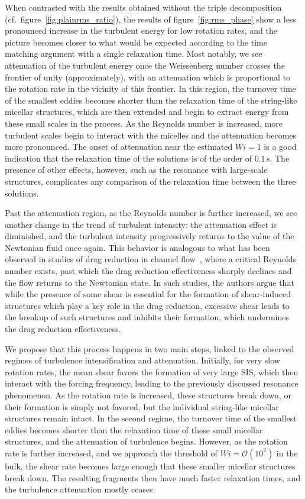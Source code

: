 \documentclass[aps,prfluids,groupedaddress,showkeys,11pt,tightenlines]{revtex4-2}
\begin{document}
When contrasted with the results obtained without the triple decomposition (cf.\ figure~\ref{fig:plainrms_ratio}), the results of figure~\ref{fig:rms_phase} show a less pronounced increase in the turbulent energy for low rotation rates, and the picture becomes closer to what would be expected according to the time matching argument with a single relaxation time. Most notably, we see attenuation of the turbulent energy once the Weissenberg number crosses the frontier of unity (approximately), with an attenuation which is proportional to the rotation rate in the vicinity of this frontier. In this region, the turnover time of the smallest eddies becomes shorter than the relaxation time of the string-like micellar structures, which are then extended and begin to extract energy from these small scales in the process. As the Reynolds number is increased, more turbulent scales begin to interact with the micelles and the attenuation becomes more pronounced. The onset of attenuation near the estimated $Wi=1$ is a good indication that the relaxation time of the solutions is of the order of $0.1$\,s. The presence of other effects, however, such as the resonance with large-scale structures, complicates any comparison of the relaxation time between the three solutions.

Past the attenuation region, as the Reynolds number is further increased, we see another change in the trend of turbulent intensity: the attenuation effect is diminished, and the turbulent intensity progressively returns to the value of the Newtonian fluid once again. This behavior is analogous to what has been observed in studies of drag reduction in channel flow~\cite{motozawa_experimental_2011,wei_combined_2012}, where a critical Reynolds number exists, past which the drag reduction effectiveness sharply declines and the flow returns to the Newtonian state. In such studies, the authors argue that while the presence of some shear is essential for the formation of shear-induced structures which play a key role in the drag reduction, excessive shear leads to the breakup of such structures and inhibits their formation, which undermines the drag reduction effectiveness.

We propose that this process happens in two main steps, linked to the observed regimes of turbulence intensification and attenuation. Initially, for very slow rotation rates, the mean shear favors the formation of very large SIS, which then interact with the forcing frequency, leading to the previously discussed resonance phenomenon. As the rotation rate is increased, these structures break down, or their formation is simply not favored, but the individual string-like micellar structures remain intact. In the second regime, the turnover time of the smallest eddies becomes shorter than the relaxation time of these small micellar structures, and the attenuation of turbulence begins. However, as the rotation rate is further increased, and we approach the threshold of $Wi=\mathcal{O}(10^2)$ in the bulk, the shear rate becomes large enough that these smaller micellar structures break down. The resulting fragments then have much faster relaxation times, and the turbulence attenuation mostly ceases.
\end{document}
